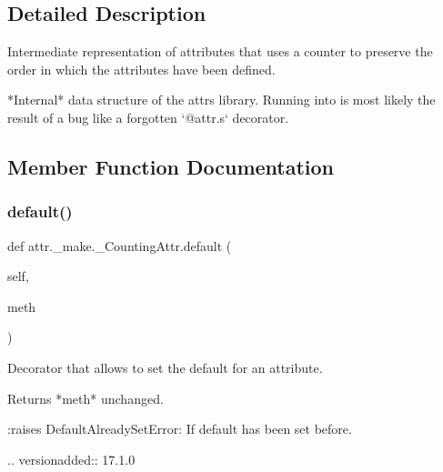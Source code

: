\subsection{Detailed Description}
\begin{DoxyVerb}Intermediate representation of attributes that uses a counter to preserve
the order in which the attributes have been defined.

*Internal* data structure of the attrs library.  Running into is most
likely the result of a bug like a forgotten `@attr.s` decorator.
\end{DoxyVerb}
 

\subsection{Member Function Documentation}
\mbox{\label{classattr_1_1__make_1_1___counting_attr_aa1f465e9d138d51149a0446d9047c085}} 
\subsubsection{\texorpdfstring{default()}{default()}}
{\footnotesize\ttfamily def attr.\+\_\+make.\+\_\+\+Counting\+Attr.\+default (\begin{DoxyParamCaption}\item[{}]{self,  }\item[{}]{meth }\end{DoxyParamCaption})}

\begin{DoxyVerb}Decorator that allows to set the default for an attribute.

Returns *meth* unchanged.

:raises DefaultAlreadySetError: If default has been set before.

.. versionadded:: 17.1.0
\end{DoxyVerb}
 \mbox{\label{classattr_1_1__make_1_1___counting_attr_ad1d47ecf562bb33fd365b2f9ebb193e3}} 
